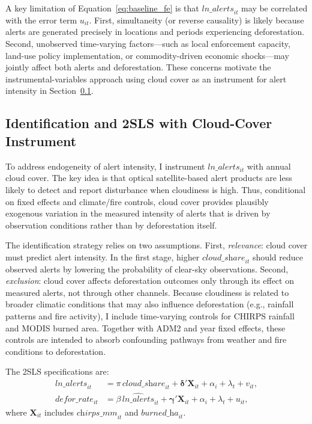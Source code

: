 \documentclass[hidelinks,12pt]{article}
\begin{document}
A key limitation of Equation~\eqref{eq:baseline_fe} is that $\textit{ln\_alerts}_{it}$ may be correlated with the error term $u_{it}$. First, simultaneity (or reverse causality) is likely because alerts are generated precisely in locations and periods experiencing deforestation. Second, unobserved time-varying factors—such as local enforcement capacity, land-use policy implementation, or commodity-driven economic shocks—may jointly affect both alerts and deforestation. These concerns motivate the instrumental-variables approach using cloud cover as an instrument for alert intensity in Section~\ref{sec:iv}.

\subsection{Identification and 2SLS with Cloud-Cover Instrument}
\label{sec:iv}

To address endogeneity of alert intensity, I instrument $\textit{ln\_alerts}_{it}$ with annual cloud cover. The key idea is that optical satellite-based alert products are less likely to detect and report disturbance when cloudiness is high. Thus, conditional on fixed effects and climate/fire controls, cloud cover provides plausibly exogenous variation in the measured intensity of alerts that is driven by observation conditions rather than by deforestation itself.

The identification strategy relies on two assumptions. First, \emph{relevance}: cloud cover must predict alert intensity. In the first stage, higher $\textit{cloud\_share}_{it}$ should reduce observed alerts by lowering the probability of clear-sky observations. Second, \emph{exclusion}: cloud cover affects deforestation outcomes only through its effect on measured alerts, not through other channels. Because cloudiness is related to broader climatic conditions that may also influence deforestation (e.g., rainfall patterns and fire activity), I include time-varying controls for CHIRPS rainfall and MODIS burned area. Together with ADM2 and year fixed effects, these controls are intended to absorb confounding pathways from weather and fire conditions to deforestation.

The 2SLS specifications are:
\begin{align}
\label{eq:first_stage}
  \textit{ln\_alerts}_{it}
  &= \pi\,\textit{cloud\_share}_{it} + \boldsymbol{\delta}'\mathbf{X}_{it} + \alpha_i + \lambda_t + v_{it}, \\
\label{eq:second_stage}
  defor\_rate_{it}
  &= \beta\,\widehat{\textit{ln\_alerts}}_{it} + \boldsymbol{\gamma}'\mathbf{X}_{it} + \alpha_i + \lambda_t + u_{it},
\end{align}
where $\mathbf{X}_{it}$ includes $\textit{chirps\_mm}_{it}$ and $\textit{burned\_ha}_{it}$.
\end{document}
